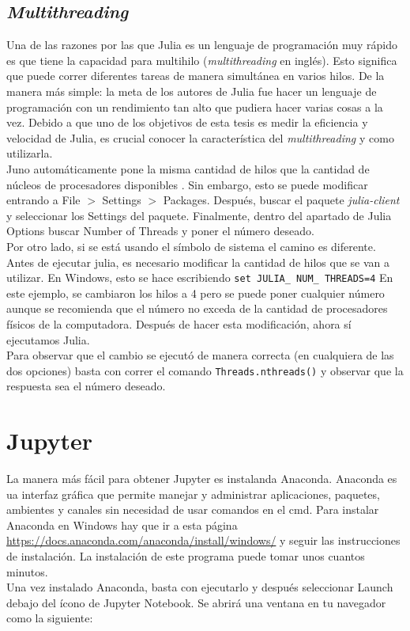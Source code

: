 \subsection{\textit{Multithreading}}
Una de las razones por las que Julia es un lenguaje de programación muy rápido es que tiene la capacidad para multihilo (\textit{multithreading} en inglés). Esto significa que puede correr diferentes tareas de manera simultánea en varios hilos. De la manera más simple: la meta de los autores de Julia fue hacer un lenguaje de programación con un rendimiento tan alto que pudiera hacer varias cosas a la vez. Debido a que uno de los objetivos de esta tesis es medir la eficiencia y velocidad de Julia, es crucial conocer la característica del \textit{multithreading} y como utilizarla. 
\\
Juno automáticamente pone la misma cantidad de hilos que la cantidad de núcleos de procesadores disponibles \citep{multithreading-julia}. Sin embargo, esto se puede modificar entrando a \textsf{File} $>$ \textsf{Settings} $>$ \textsf{Packages}. Después, buscar el paquete \textit{julia-client} y seleccionar los \textsf{Settings} del paquete. Finalmente, dentro del apartado de \textsf{Julia Options} buscar \textsf{Number of Threads} y poner el número deseado. 
\\
Por otro lado, si se está usando el símbolo de sistema el camino es diferente. Antes de ejecutar julia, es necesario modificar la cantidad de hilos que se van a utilizar. En Windows, esto se hace escribiendo \texttt{set JULIA\_ NUM\_ THREADS=4} \citep{Julia_manual} En este ejemplo, se cambiaron los hilos a 4 pero se puede poner cualquier número aunque se recomienda que el número no exceda de la cantidad de procesadores físicos de la computadora. Después de hacer esta modificación, ahora sí ejecutamos Julia. 
\\
Para observar que el cambio se ejecutó de manera correcta (en cualquiera de las dos opciones) basta con correr el comando \texttt{Threads.nthreads()} y observar que la respuesta sea el número deseado. 

\section{Jupyter}
La manera más fácil para obtener Jupyter es instalanda Anaconda. Anaconda es ua interfaz gráfica que permite manejar y administrar aplicaciones, paquetes, ambientes y canales sin necesidad de usar comandos en el cmd. Para instalar Anaconda en Windows hay que ir a esta página \url{https://docs.anaconda.com/anaconda/install/windows/} y seguir las instrucciones de instalación. La instalación de este programa puede tomar unos cuantos minutos. 
\\
Una vez instalado Anaconda, basta con ejecutarlo y después seleccionar \textsf{Launch} debajo del ícono de Jupyter Notebook. Se abrirá una ventana en tu navegador como la siguiente: 

